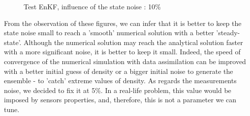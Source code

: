 \documentclass[letterpaper,10pt]{article}
\begin{document}
\begin{figure}
  \centering
  \caption{Test EnKF, influence of the state noise : 10\%}\label{influence_stateNoise3}
\end{figure}

From the observation of these figures, we can infer that it is better to keep the state noise small to reach a 'smooth' numerical solution with a better 'steady-state'. Although the numerical solution may reach the analytical solution faster with a more significant noise, it is better to keep it small. Indeed, the speed of convergence of the numerical simulation with data assimilation can be improved with a better initial guess of density or a bigger initial noise to generate the ensemble - to 'catch' extreme values of density. As regards the measurements noise, we decided to fix it at 5\%. In a real-life problem, this value would be imposed by sensors properties, and, therefore, this is not a parameter we can tune.  

\bigskip
\end{document}
